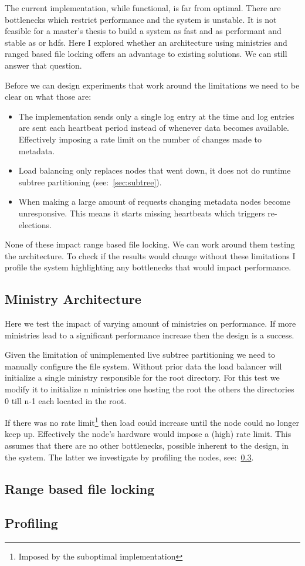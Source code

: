 The current implementation, while functional, is far from optimal. There are bottlenecks which restrict performance and the system is unstable. It is not feasible for a master’s thesis to build a system as fast and as performant and stable as \ceph{} or \ac{hdfs}. Here I explored whether an architecture using ministries and ranged based file locking offers an advantage to existing solutions. We can still answer that question. 

Before we can design experiments that work around the limitations we need to be clear on what those are:

\begin{itemize}
	\item The \raft{} implementation sends only a single log entry at the time and log entries are sent each heartbeat period instead of whenever data becomes available. Effectively imposing a rate limit on the number of changes made to metadata.
	\item Load balancing only replaces nodes that went down, it does not do runtime subtree partitioning (see:~\cref{sec:subtree}).
	\item When making a large amount of requests changing metadata nodes become unresponsive. This means it starts missing heartbeats which triggers re-elections. %
\end{itemize}

None of these impact range based file locking. We can work around them testing the architecture. To check if the results would change without these limitations I profile the system highlighting any bottlenecks that would impact performance.

\subsection{Ministry Architecture}
Here we test the impact of varying amount of ministries on performance. If more ministries lead to a significant performance increase then the design is a success. 

Given the limitation of unimplemented live subtree partitioning we need to manually configure the file system. Without prior data the load balancer will initialize a single ministry responsible for the root directory. For this test we modify it to initialize n ministries one hosting the root the others the directories 0 till n-1 each located in the root.

If there was no rate limit\footnote{Imposed by the suboptimal \raft{} implementation} then load could increase until the node could no longer keep up. Effectively the node's hardware would impose a (high) rate limit. This assumes that there are no other bottlenecks, possible inherent to the design, in the system. The latter we investigate by profiling the nodes, see:~\cref{sec:profile}.


\subsection{Range based file locking}

\subsection{Profiling} \label{sec:profile}
